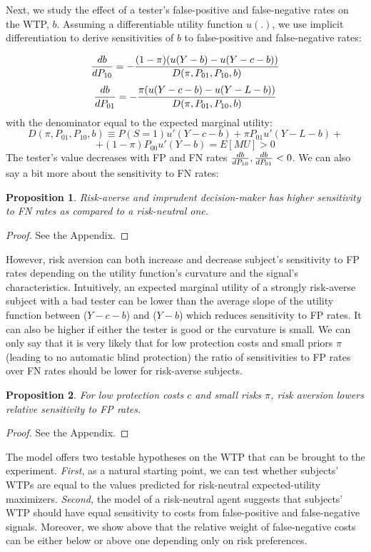\documentclass[12pt,a4paper]{article}
\newtheorem{theorem}{Proposition}
\begin{document}
Next, we study the effect of a tester's false-positive and false-negative rates on the WTP, $b$. Assuming a differentiable utility function $u(.)$, we use implicit differentiation to derive sensitivities of $b$ to false-positive and false-negative rates:

$${db\over dP_{10}}=-{(1-\pi)(u(Y-b)-u(Y-c-b))\over D(\pi, P_{01}, P_{10}, b)}$$
$${db\over dP_{01}}=-{\pi(u(Y-c-b)-u(Y-L-b))\over D(\pi, P_{01}, P_{10}, b)}$$
with the denominator equal to the expected marginal utility:
$$D(\pi, P_{01}, P_{10}, b)\equiv P(S=1)u'(Y-c-b)+\pi P_{01}u'(Y-L-b)+$$
$$+(1-\pi)P_{00}u'(Y-b)=E[MU]>0$$
The tester's value decreases with FP and FN rates ${db\over dP_{10}},{db\over dP_{01}}<0$. We can also say a bit more about the sensitivity to FN rates:
\begin{theorem}
Risk-averse and imprudent decision-maker has higher sensitivity to FN rates as compared to a risk-neutral one.
\end{theorem}\label{thm:riskAverse}  
\begin{proof}
See the Appendix.
\end{proof}

However, risk aversion can both increase and decrease subject's sensitivity to FP rates depending on the utility function's curvature and the signal's characteristics. Intuitively, an expected marginal utility of a strongly risk-averse subject with a bad tester can be lower than the average slope of the utility function between ($Y-c-b$) and ($Y-b$) which reduces sensitivity to FP rates. It can also be higher if either the tester is good or the curvature is small. We can only say that it is very likely that for low protection costs and small priors $\pi$ (leading to no automatic blind protection) the ratio of sensitivities to FP rates over FN rates should be lower for risk-averse subjects. 

\begin{theorem}
For low protection costs $c$ and small risks $\pi$, risk aversion lowers relative sensitivity to FP rates. 
\end{theorem}\label{thm:riskAverse2}  

\begin{proof}
See the Appendix.
\end{proof}


\noindent The model offers two testable hypotheses on the WTP that can be brought to the experiment. \emph{First,} as a natural starting point, we can test whether subjects' WTPs are equal to the values predicted for risk-neutral expected-utility maximizers. 
\emph{Second,} the model of a risk-neutral agent suggests that subjects' WTP should have equal sensitivity to costs from false-positive and false-negative signals. Moreover, we show above that the relative weight of false-negative costs can be either below or above one depending only on risk preferences.
\end{document}
